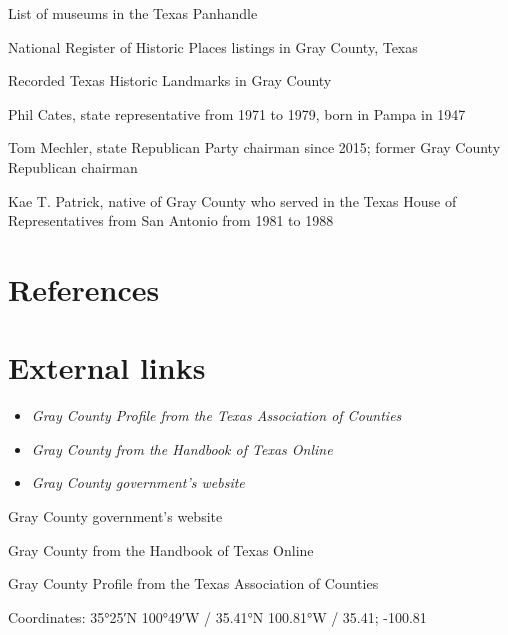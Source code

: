 List of museums in the Texas Panhandle

National Register of Historic Places listings in Gray County, Texas

Recorded Texas Historic Landmarks in Gray County

Phil Cates, state representative from 1971 to 1979, born in Pampa in
1947

Tom Mechler, state Republican Party chairman since 2015; former Gray
County Republican chairman

Kae T. Patrick, native of Gray County who served in the Texas House of
Representatives from San Antonio from 1981 to 1988

\section{References}\label{references}

\section{External links}\label{external-links}

\begin{itemize}
\item
  \emph{Gray County Profile from the Texas Association of Counties}
\item
  \emph{Gray County from the Handbook of Texas Online}
\item
  \emph{Gray County government's website}
\end{itemize}

Gray County government's website

Gray County from the Handbook of Texas Online

Gray County Profile from the Texas Association of Counties

Coordinates: 35°25′N 100°49′W﻿ / ﻿35.41°N 100.81°W﻿ / 35.41; -100.81

